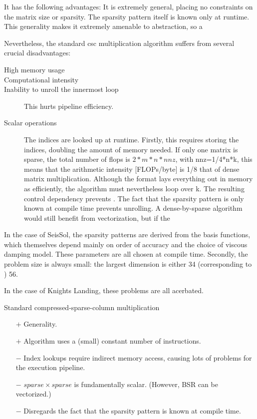   It has the following advantages: It is extremely general, placing no constraints on the matrix size or sparsity. 
  The sparsity pattern itself is known only at runtime. This generality makes it extremely amenable to abstraction, so a 

  Nevertheless, the standard csc multiplication algorithm suffers from several crucial disadvantages: 

\begin{description}
  \item[High memory usage]

  \item[Computational intensity]

  \item[Inability to unroll the innermost loop] This hurts pipeline efficiency.

  \item[Scalar operations]

  The indices are looked up at runtime. Firstly, this requires storing the indices, doubling the amount of memory needed. If only one matrix is sparse, the total number of flops is $2 * m * n * nnz$, with nnz=1/4*n*k, this means that the arithmetic intensity [FLOPs/byte] is 1/8 that of dense matrix multiplication. 
  Although the format lays everything out in memory as efficiently, the algorithm must nevertheless loop over k. The resulting control dependency prevents . The fact that the sparsity pattern is only known at compile time prevents unrolling. 
  A dense-by-sparse algorithm would still benefit from vectorization, but if the 

\end{description}


In the case of SeisSol, the sparsity patterns are derived from the basis functions, which themselves depend mainly on order of accuracy and the choice of viscous damping model. These parameters are all chosen at compile time. Secondly, the problem size is always small: the largest dimension is either 34 (corresponding to ) 56. 

In the case of Knights Landing, these problems are all acerbated. 





  Standard compressed-sparse-column multiplication
    \begin{itemize}
      \item[$+$] Generality.
      \item[$+$] Algorithm uses a (small) constant number of instructions.
      \item[$-$] Index lookups require indirect memory access, causing lots of problems for the execution pipeline.
      \item[$-$] $sparse \times sparse$ is fundamentally scalar. (However, BSR can be vectorized.)
      \item[$-$] Disregards the fact that the sparsity pattern is known at compile time.
    \end{itemize}


